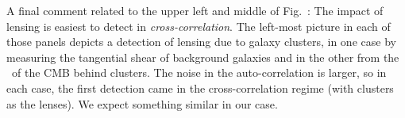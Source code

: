 
A final  comment related to the
upper left and middle  of Fig.~: The impact of lensing
is easiest to detect in {\it cross-correlation}. The left-most picture
in each of those panels depicts a detection of lensing due to galaxy
clusters, in one case by measuring the tangential shear of background
galaxies and in the other from the \atf\ of the CMB behind
clusters. The noise in the auto-correlation is larger, so in each
case, the first detection came in the cross-correlation regime (with
clusters as the lenses). We expect something similar in our case.

